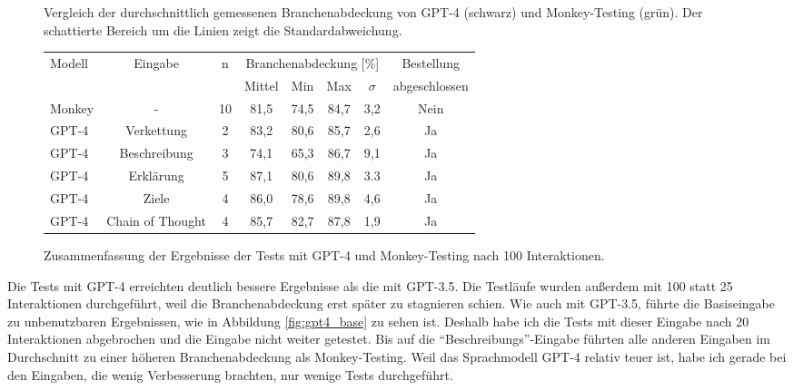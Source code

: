 \begin{figure}
    \centering
    \hfill
    \hfill
    \hfill
    \caption{Vergleich der durchschnittlich gemessenen Branchenabdeckung von GPT-4 (schwarz) und Monkey-Testing (grün). Der schattierte Bereich um die Linien zeigt die Standardabweichung.}
\end{figure}



\begin{figure}
    \centering
    \begin{tabular}{|l|c|c|c|c|c|c|c|}
        \hline
        Modell & Eingabe & n & \multicolumn{4}{c|}{Branchenabdeckung [\%]} & Bestellung  \\
         &  &  & Mittel & Min & Max & $\sigma$ & abgeschlossen \\
        \hline
        Monkey & - & 10 & 81,5 & 74,5 & 84,7 & 3,2 & Nein \\
        GPT-4 & Verkettung & 2 & 83,2 & 80,6 & 85,7 & 2,6 & Ja \\
        GPT-4 & Beschreibung & 3 & 74,1 & 65,3 & 86,7 & 9,1 & Ja\\
        GPT-4 & Erklärung & 5 & 87,1 & 80,6 & 89,8 & 3.3 & Ja \\
        GPT-4 & Ziele & 4 & 86,0 & 78,6 & 89,8 & 4,6 & Ja \\
        GPT-4 & Chain of Thought & 4 & 85,7 & 82,7 & 87,8 & 1,9 & Ja \\
        \hline
    \end{tabular}
    \caption{Zusammenfassung der Ergebnisse der Tests mit GPT-4 und Monkey-Testing nach 100 Interaktionen.}
    \label{tab:results_100}
\end{figure}

Die Tests mit GPT-4 erreichten deutlich bessere Ergebnisse als die mit GPT-3.5.
Die Testläufe wurden außerdem mit 100 statt 25 Interaktionen durchgeführt, weil die Branchenabdeckung erst später zu stagnieren schien.
Wie auch mit GPT-3.5, führte die Basiseingabe zu unbenutzbaren Ergebnissen, wie in Abbildung \ref{fig:gpt4_base} zu sehen ist.
Deshalb habe ich die Tests mit dieser Eingabe nach 20 Interaktionen abgebrochen und die Eingabe nicht weiter getestet.
Bis auf die \enquote{Beschreibungs}-Eingabe führten alle anderen Eingaben im Durchschnitt zu einer höheren Branchenabdeckung als Monkey-Testing.
Weil das Sprachmodell GPT-4 relativ teuer ist, habe ich gerade bei den Eingaben, die wenig Verbesserung brachten, nur wenige Tests durchgeführt.

